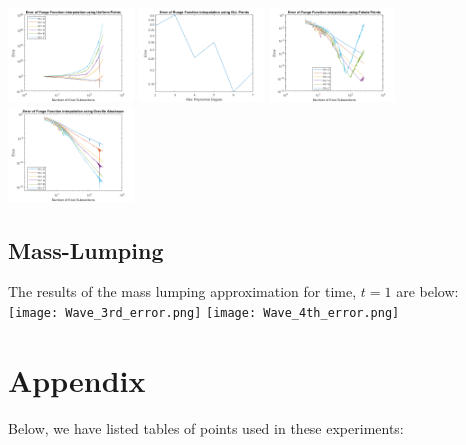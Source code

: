 \documentclass{article}
\begin{document}
\includegraphics[height = 2.5cm]{RungeUniform.png} \includegraphics[height = 2.5cm]{RungeGLL.png}
\includegraphics[height = 2.5cm]{RungeFekete.png} \includegraphics[height = 2.5cm]{RungeGreville.png}

\subsection*{Mass-Lumping}
The results of the mass lumping approximation for time, $t=1$ are below:
\newline
\texttt{[image: Wave\_3rd\_error.png]} \texttt{[image: Wave\_4th\_error.png]}

\section*{Appendix}
Below, we have listed tables of points used in these experiments:
\end{document}
